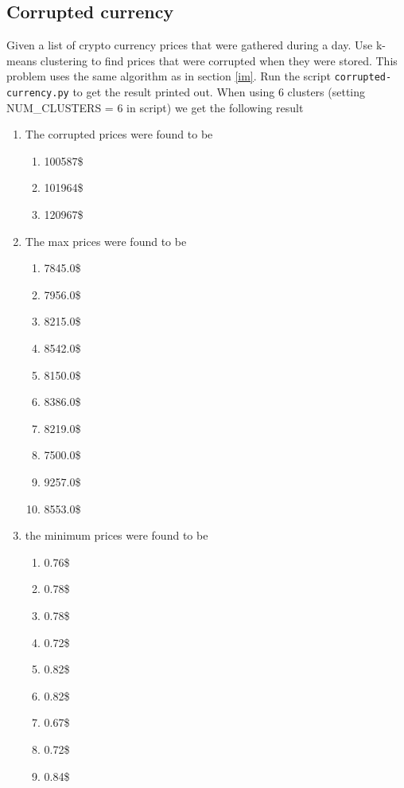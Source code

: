 \documentclass{article}
\begin{document}
        \subsection{Corrupted currency}
        Given a list of crypto currency prices that were gathered during a day. Use k-means clustering to find prices that were corrupted when they were stored. This problem uses the same algorithm as in section \ref{im}. Run the script \texttt{corrupted-currency.py} to get the result printed out. When using 6 clusters (setting NUM\_CLUSTERS = 6 in script) we get the following result
        
        \begin{enumerate}[label=(\alph*)]
            \item The corrupted prices were found to be 
            \begin{enumerate}
                \item 100587\$
                \item 101964\$
                \item 120967\$
            \end{enumerate}
            \item The max prices were found to be
            \begin{enumerate}
                \item 7845.0\$
                \item 7956.0\$
                \item 8215.0\$
                \item 8542.0\$
                \item 8150.0\$
                \item 8386.0\$
                \item 8219.0\$
                \item 7500.0\$
                \item 9257.0\$
                \item 8553.0\$
            \end{enumerate}
            \item the minimum prices were found to be
            \begin{enumerate}
	            \item 0.76\$
            	\item 0.78\$
            	\item 0.78\$
            	\item 0.72\$
            	\item 0.82\$
            	\item 0.82\$
            	\item 0.67\$
            	\item 0.72\$
            	\item 0.84\$
            \end{enumerate}
        \end{enumerate}
\end{document}
